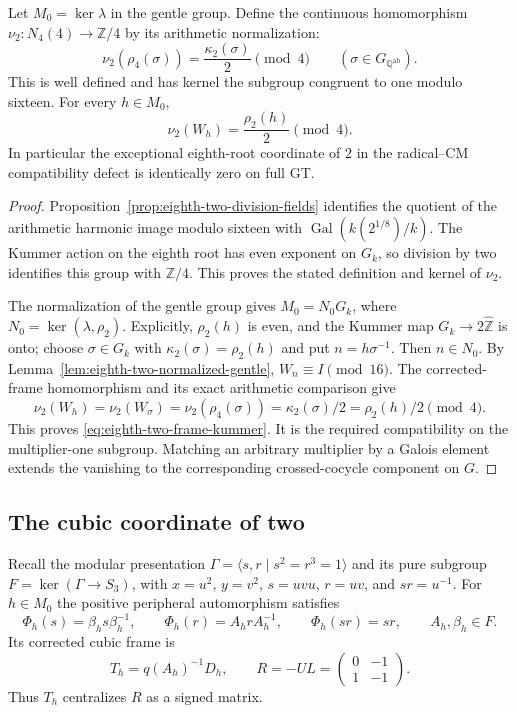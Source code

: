 \begin{theorem}\label{thm:eighth-two-compatibility}
Let $M_0=\ker\lambda$ in the gentle group.  Define the continuous
homomorphism
$\nu_2:N_4(4)\to\mathbb Z/4$ by its arithmetic normalization:
\[
 \nu_2(\rho_4(\sigma))
       =\frac{\kappa_2(\sigma)}2\pmod4
       \qquad(\sigma\in G_{\mathbb Q^{\mathrm{ab}}}).
\]
This is well defined and has kernel the subgroup congruent to
one modulo sixteen.  For every $h\in M_0$,
\begin{equation}
 \nu_2(W_h)=\frac{\rho_2(h)}2\pmod4.
 \label{eq:eighth-two-frame-kummer}
\end{equation}
In particular the exceptional eighth-root coordinate of $2$
in the radical--CM compatibility defect is identically zero
on full GT.
\end{theorem}

\begin{proof}
Proposition~\ref{prop:eighth-two-division-fields} identifies
the quotient of the arithmetic harmonic image modulo sixteen
with $\operatorname{Gal}(k(2^{1/8})/k)$.
The Kummer action on the eighth root has even exponent on $G_k$,
so division by two identifies this group with $\mathbb Z/4$.
This proves the stated definition and kernel of $\nu_2$.

The normalization of the gentle group gives
$M_0=N_0G_k$, where $N_0=\ker(\lambda,\rho_2)$.
Explicitly, $\rho_2(h)$ is even, and the Kummer map
$G_k\to2\widehat{\mathbb Z}$ is onto; choose $\sigma\in G_k$
with $\kappa_2(\sigma)=\rho_2(h)$ and put $n=h\sigma^{-1}$.
Then $n\in N_0$.
By Lemma~\ref{lem:eighth-two-normalized-gentle},
$W_n\equiv I\pmod{16}$.
The corrected-frame homomorphism and its exact arithmetic
comparison give
\[
 \nu_2(W_h)=\nu_2(W_\sigma)
           =\nu_2(\rho_4(\sigma))
           =\kappa_2(\sigma)/2
           =\rho_2(h)/2\pmod4.
\]
This proves \eqref{eq:eighth-two-frame-kummer}.
It is the required compatibility on the multiplier-one subgroup.
Matching an arbitrary multiplier by a Galois element extends the
vanishing to the corresponding crossed-cocycle component on $G$.
\end{proof}

\subsection{The cubic coordinate of two}

Recall the modular presentation
$\Gamma=\langle s,r\mid s^2=r^3=1\rangle$ and its pure subgroup
$F=\ker(\Gamma\to S_3)$, with
$x=u^2$, $y=v^2$, $s=uvu$, $r=uv$, and $sr=u^{-1}$.
For $h\in M_0$ the positive peripheral automorphism satisfies
\[
 \Phi_h(s)=\beta_hs\beta_h^{-1},\qquad
 \Phi_h(r)=A_hrA_h^{-1},\qquad
 \Phi_h(sr)=sr,
 \qquad A_h,\beta_h\in F .
\]
Its corrected cubic frame is
\[
 T_h=q(A_h)^{-1}D_h,\qquad
 R=-UL=\begin{pmatrix}0&-1\\1&-1\end{pmatrix}.
\]
Thus $T_h$ centralizes $R$ as a signed matrix.

